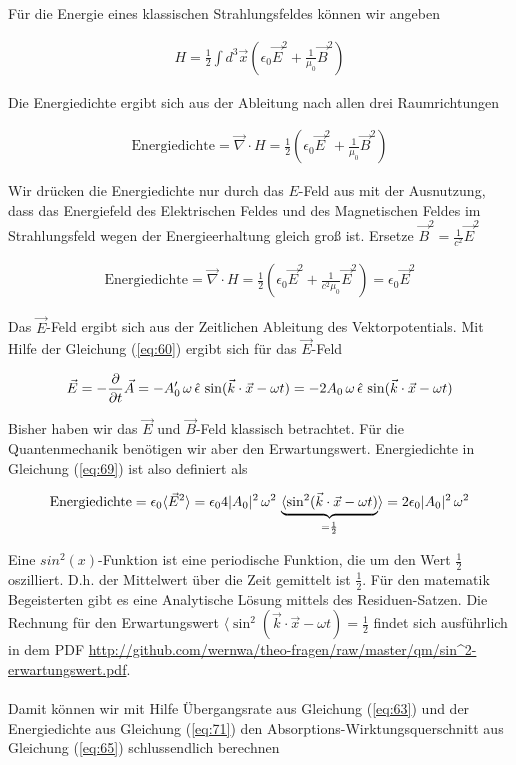 Für die Energie eines klassischen Strahlungsfeldes können wir angeben

\begin{align}
  \label{eq:67}
  H = \frac{1}{2}\int d^3\vec x \left( \epsilon_0 \vec E^2 + \frac{1}{\mu_0} \vec B^2 \right)
\end{align}

Die Energiedichte ergibt sich aus der Ableitung nach allen drei Raumrichtungen

\begin{align}
  \label{eq:68}
  \text{Energiedichte} = \vec \nabla\cdot H = \frac{1}{2}\left(\epsilon_0 \vec E^2 + \frac{1}{\mu_0} \vec B^2 \right)
\end{align}

Wir drücken die Energiedichte nur durch das \(E\)-Feld aus mit der Ausnutzung, dass das Energiefeld des Elektrischen Feldes und des Magnetischen Feldes im Strahlungsfeld wegen der Energieerhaltung gleich groß ist. Ersetze \(\vec B^2 = \frac{1}{c^2}\vec E^2\)

\begin{align}
  \label{eq:69}
  \text{Energiedichte} = \vec \nabla\cdot H = \frac{1}{2}\left(\epsilon_0 \vec E^2 + \frac{1}{c^2\mu_0} \vec E^2  \right) = \epsilon_0 \vec E^2
\end{align}

Das \(\vec E\)-Feld ergibt sich aus der Zeitlichen Ableitung des Vektorpotentials. Mit Hilfe der Gleichung (\ref{eq:60}) ergibt sich für das \(\vec E\)-Feld

\begin{align}
  \label{eq:70}
  \vec E = - \pdiff_t \vec A = - A'_0\, \omega\, \hat\epsilon\, \sin(\vec k\cdot \vec x - \omega t) = - 2 A_0\, \omega\, \hat\epsilon\, \sin(\vec k\cdot \vec x - \omega t)
\end{align}

Bisher haben wir das \(\vec E\) und \(\vec B\)-Feld klassisch betrachtet. Für die Quantenmechanik benötigen wir aber den Erwartungswert. Energiedichte in Gleichung (\ref{eq:69}) ist also definiert als

\begin{align}
  \label{eq:71}
  \text{Energiedichte} = \epsilon_0 \langle \vec E^2 \rangle =  \epsilon_0 4 |A_0|^2\, \omega^2\, \underbr{\langle \sin^2(\vec k\cdot \vec x - \omega t)}_{= \frac{1}{2}} \rangle = 2 \epsilon_0 |A_0|^2\, \omega^2
\end{align}

Eine \(sin^2(x)\)-Funktion ist eine periodische Funktion, die um den Wert \(\frac{1}{2}\) oszilliert. D.h. der Mittelwert über die Zeit gemittelt ist \(\frac{1}{2}\). Für den matematik Begeisterten gibt es eine Analytische Lösung mittels des Residuen-Satzen. Die Rechnung für den Erwartungswert \(\langle \sin^2(\vec k\cdot \vec x - \omega t)=\frac{1}{2}\) findet sich ausführlich in dem PDF \url{http://github.com/wernwa/theo-fragen/raw/master/qm/sin^2-erwartungswert.pdf}.\\
\\
Damit können wir mit Hilfe Übergangsrate aus Gleichung (\ref{eq:63}) und der Energiedichte aus Gleichung (\ref{eq:71}) den Absorptions-Wirktungsquerschnitt aus Gleichung (\ref{eq:65}) schlussendlich berechnen

